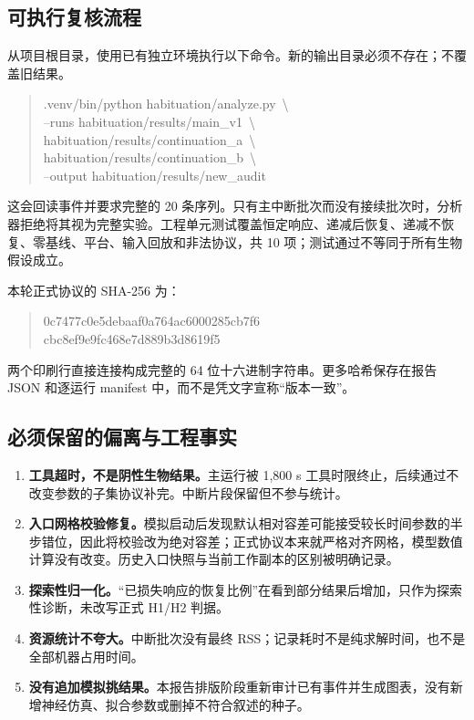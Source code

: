 \subsection{可执行复核流程}
从项目根目录，使用已有独立环境执行以下命令。新的输出目录必须不存在；不覆盖旧结果。
\begin{quote}\footnotesize\ttfamily
.venv/bin/python habituation/analyze.py\ \textbackslash\\
\hspace*{1em}--runs habituation/results/main\_v1\ \textbackslash\\
\hspace*{2em}habituation/results/continuation\_a\ \textbackslash\\
\hspace*{2em}habituation/results/continuation\_b\ \textbackslash\\
\hspace*{1em}--output habituation/results/new\_audit
\end{quote}
这会回读事件并要求完整的 20 条序列。只有主中断批次而没有接续批次时，分析器拒绝将其视为完整实验。工程单元测试覆盖恒定响应、递减后恢复、递减不恢复、零基线、平台、输入回放和非法协议，共 10 项；测试通过不等同于所有生物假设成立。

本轮正式协议的 SHA-256 为：
\begin{quote}\small\ttfamily
0c7477c0e5debaaf0a764ac6000285cb7f6\\
cbc8ef9e9fc468e7d889b3d8619f5
\end{quote}
两个印刷行直接连接构成完整的 64 位十六进制字符串。更多哈希保存在报告 JSON 和逐运行 manifest 中，而不是凭文字宣称“版本一致”。

\subsection{必须保留的偏离与工程事实}
\begin{enumerate}
\item \textbf{工具超时，不是阴性生物结果。}主运行被 1,800 s 工具时限终止，后续通过不改变参数的子集协议补完。中断片段保留但不参与统计。
\item \textbf{入口网格校验修复。}模拟启动后发现默认相对容差可能接受较长时间参数的半步错位，因此将校验改为绝对容差；正式协议本来就严格对齐网格，模型数值计算没有改变。历史入口快照与当前工作副本的区别被明确记录。
\item \textbf{探索性归一化。}“已损失响应的恢复比例”在看到部分结果后增加，只作为探索性诊断，未改写正式 H1/H2 判据。
\item \textbf{资源统计不夸大。}中断批次没有最终 RSS；记录耗时不是纯求解时间，也不是全部机器占用时间。
\item \textbf{没有追加模拟挑结果。}本报告排版阶段重新审计已有事件并生成图表，没有新增神经仿真、拟合参数或删掉不符合叙述的种子。
\end{enumerate}

